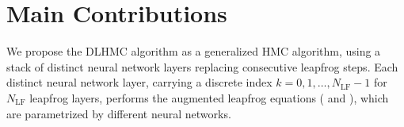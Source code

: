 \documentclass{article} %
\begin{document}
\section{\label{sec:maincontributions}Main Contributions}
We propose the DLHMC algorithm as a generalized HMC algorithm,
      using a stack of distinct neural network layers replacing consecutive leapfrog steps.
      Each distinct neural network layer, carrying a discrete index \(k = 0, 1, \ldots, N_{\mathrm{LF}}-1\) for $N_{\mathrm{LF}}$
      leapfrog layers, performs the
      augmented leapfrog equations ( and ), %
      which are parametrized by different neural networks.
      
   
\end{document}
